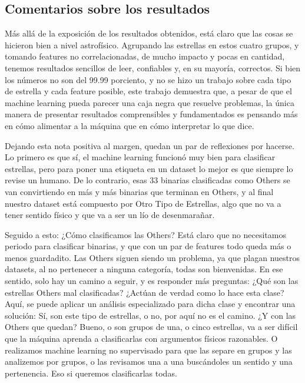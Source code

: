 \documentclass[10pt,twocolumn]{article}
\begin{document}
\subsection{Comentarios sobre los resultados}

Más allá de la exposición de los resultados obtenidos, está claro que las cosas se hicieron bien a nivel astrofísico. Agrupando las estrellas en estos cuatro grupos, 
y tomando features no correlacionadas, de mucho impacto y pocas en cantidad, tenemos resultados sencillos de leer, confiables y, en su mayoría, correctos. Si bien los 
números no son del 99.99 porciento, y no se hizo un trabajo sobre cada tipo de estrella y cada feature posible, este trabajo demuestra que, a pesar de que el machine 
learning pueda parecer una caja negra que resuelve problemas, la única manera de presentar resultados comprensibles y fundamentados es pensando más en cómo alimentar
a la máquina que en cómo interpretar lo que dice. 

Dejando esta nota positiva al margen, quedan un par de reflexiones por hacerse. Lo primero es que sí, el machine learning funcionó 
muy bien para clasificar estrellas, pero para poner una etiqueta en un dataset lo mejor es que siempre lo revise un humano. De lo contrario, esas 33 binarias 
clasificadas como Others se van convirtiendo en más y más binarias que terminan en Others, y al final nuestro dataset está compuesto por Otro Tipo de Estrellas, 
algo que no va a tener sentido físico y que va a ser un lío de desenmarañar. 

Seguido a esto: ¿Cómo clasificamos las Others? Está claro que no necesitamos periodo para clasificar binarias, y que con un par de features todo queda más o menos guardadito.
Las Others siguen siendo un problema, ya que plagan nuestros datasets, al no pertenecer a ninguna categoría, todas son bienvenidas. En ese sentido, solo hay un camino a seguir, 
y es responder más preguntas: ¿Qué son las estrellas Others mal clasificadas? ¿Actúan de verdad como lo hace esta clase? Aquí, se puede aplicar un análisis especializado para 
dicha clase y encontrar una solución: Sí, son este tipo de estrellas, o no, por aquí no es el camino. ¿Y con las Others que quedan? Bueno, o son grupos de una, o cinco estrellas, 
va a ser difícil que la máquina aprenda a clasificarlas con argumentos físicos razonables. O realizamos machine learning no supervisado para que las separe en grupos y las analizemos 
por grupos, o las revisamos una a una buscándoles un sentido y una pertenencia. Eso si queremos clasificarlas todas.
\end{document}
